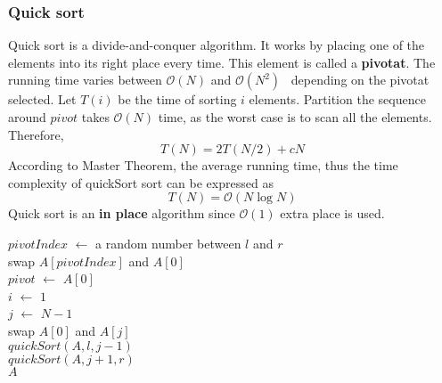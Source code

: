 \documentclass[catalog.tex]{subfiles}
\begin{document}
\subsubsection{Quick sort}
Quick sort is a divide-and-conquer algorithm. It works by placing one of the elements into its right place every time. This element is called a \textbf{pivotat}. The running time varies between $\mathcal{O}(N)$ and $\mathcal{O}(N^2)$~\cite{ve477} depending on the pivotat selected. Let $T(i)$ be the time of sorting $i$ elements. Partition the sequence around $pivot$ takes $\mathcal{O}(N)$ time, as the worst case is to scan all the elements.
Therefore,
$$
	T(N)=2T(N/2)+cN
$$
According to Master Theorem, the average running time, thus the time complexity of quickSort sort can be expressed as
$$
	T(N)=\mathcal{O}(N \log N)
$$
Quick sort is an \textbf{in place} algorithm since $\mathcal{O}(1)$ extra place is used.

\begin{Algorithm}[$quickSort(A,l,r)$\label{alg:\currfilebase_c}]
	\BlankLine
	$pivotIndex$ $\gets$ a random number between $l$ and $r$ \\
	swap $A[pivotIndex]$ and $A[0]$ \\
	$pivot$ $\gets$ $A[0]$ \\
	$i$ $\gets$ $1$ \\
	$j$ $\gets$ $N-1$ \\
	swap $A[0]$ and $A[j]$ \\
	$quickSort(A,l,j-1)$ \\
	$quickSort(A,j+1,r)$ \\
	\Ret $A$

\end{Algorithm}
\end{document}
